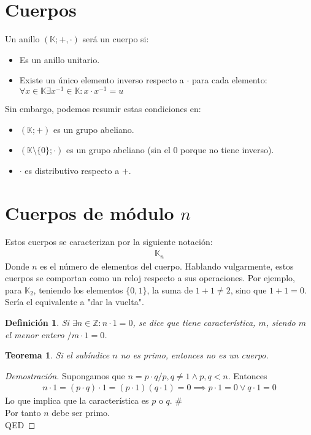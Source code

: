 \documentclass{article}
\newtheorem{caracteristica}{Definición}
\newtheorem{caracteristica primo}{Teorema}
\begin{document}
\section{Cuerpos}
Un anillo $(\mathbb{K}; +, \cdot )$ será un cuerpo si:
\begin{itemize}
    \item Es un anillo unitario.
    \item Existe un único elemento inverso respecto a $ \cdot $ para cada elemento: $\forall x \in
    \mathbb{K} \exists \! x^{-1} \in \mathbb{K} : x \cdot  x^{-1} = u$ 
\end{itemize}
Sin embargo, podemos resumir estas condiciones en:
\begin{itemize}
    \item $(\mathbb{K}; + )$ es un grupo abeliano.
    \item $(\mathbb{K} \setminus \{ 0 \}; \cdot )$ es un grupo abeliano (sin el $0$ porque no tiene inverso).
    \item $ \cdot $ es distributivo respecto a $+$. 
\end{itemize}
\section{Cuerpos de módulo $n$}
Estos cuerpos se caracterizan por la siguiente notación:
\begin{equation}
    \begin{split}
        \mathbb{K}_n
    \end{split}
\end{equation}
Donde $n$ es el número de elementos del cuerpo. Hablando vulgarmente, estos cuerpos se comportan como
un reloj respecto a sus operaciones. Por ejemplo, para $\mathbb{K}_2$, teniendo los elementos 
$\{0, 1 \}$, la suma de $1+1 \neq 2$, sino que $1+1=0$. Sería el equivalente a "dar la vuelta".
\begin{caracteristica}
    Si $\exists n \in \mathbb{Z} : n\cdot 1=0$, se dice que tiene característica, $m$, siendo
    $m$ el menor entero $/ m\cdot 1=0$.
\end{caracteristica}
\begin{caracteristica primo}
    Si el subíndice $n$ no es primo, entonces no es un cuerpo.
\end{caracteristica primo}
\begin{proof}[Demostración]
    Supongamos que $n=p\cdot q / p,q \neq 1 \wedge p,q<n$. Entonces
    \begin{equation}
        \begin{split}
            n\cdot 1=(p\cdot q)\cdot 1=(p\cdot 1)(q\cdot 1)=0 \implies p\cdot 1=0 \vee q\cdot 1=0
        \end{split}
    \end{equation}
    Lo que implica que la característica es $p$ o $q$. \#\\
    Por tanto $n$ debe ser primo.\\
    QED
\end{proof}
\end{document}
